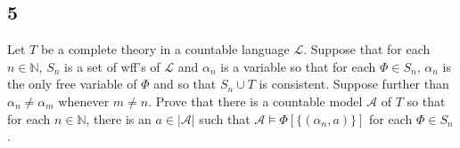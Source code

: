 \documentclass[12pt]{article}
\begin{document}
\subsection*{5}
\begin{tcolorbox}
  Let $T$ be a complete theory in a countable language $\mathcal{L}$. Suppose that for each $n \in \mathbb{N}$, $S_n$ is a set of wff's of
  $\mathcal{L}$ and $\alpha_n$ is a variable so that for each $\Phi \in S_n$, $\alpha_n$ is the only free variable of $\Phi$ and so that $S_n \cup T$
  is consistent. Suppose further than $\alpha_n \neq \alpha_m$ whenever $m \neq n$. Prove that there is a countable model $\mathcal{A}$ of $T$ so that
  for each $n \in \mathbb{N}$, there is an $a \in |\mathcal{A}|$ such that $\mathcal{A} \models \Phi[\{(\alpha_n, a)\}]$ for each $\Phi \in S_n$.
\end{tcolorbox}
\end{document}
